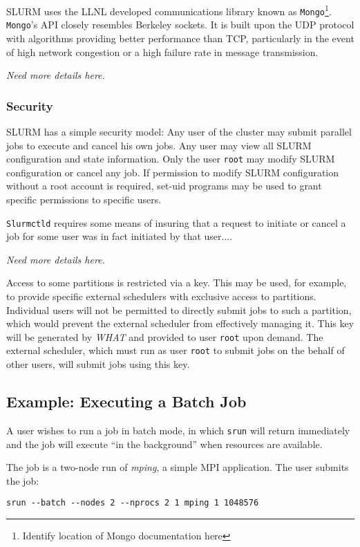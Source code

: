 SLURM uses the LLNL developed communications library known as 
{\tt Mongo}\footnote{Identify location of Mongo documentation here}. 
{\tt Mongo}'s API closely resembles Berkeley sockets. It is built upon the UDP 
protocol with algorithms providing better performance than TCP, particularly 
in the event of high network congestion or a high failure rate in message 
transmission.

{\em Need more details here.}

\subsubsection{Security}

SLURM has a simple security model: 
Any user of the cluster may submit parallel jobs to execute and cancel his own jobs. 
Any user may view all SLURM configuration and state information. 
Only the user {\tt root} may modify SLURM configuration or cancel any job.
If permission to modify SLURM configuration without a root account is 
required, set-uid programs may be used to grant specific permissions to 
specific users.

{\tt Slurmctld} requires some means of insuring that a request to initiate 
or cancel a job for some user was in fact initiated by that user....

{\em Need more details here.}

Access to some partitions is restricted via a key. 
This may be used, for example, to provide specific external schedulers with 
exclusive access to partitions. 
Individual users will not be permitted to directly submit jobs to such 
a partition, which would prevent the external scheduler from effectively 
managing it. 
This key will be generated by {\em WHAT} and provided to user {\tt root} upon 
demand. 
The external scheduler, which must run as user {\tt root} to submit jobs on 
the behalf of other users, will submit jobs using this key. 
 
\subsection{Example:  Executing a Batch Job}

A user wishes to run a job in batch mode, in which {\tt srun} will return 
immediately and the job will execute ``in the background'' when resources
are available.

The job is a two-node run of {\em mping}, a simple MPI application.
The user submits the job:
\begin{verbatim}
srun --batch --nodes 2 --nprocs 2 1 mping 1 1048576
\end{verbatim}

